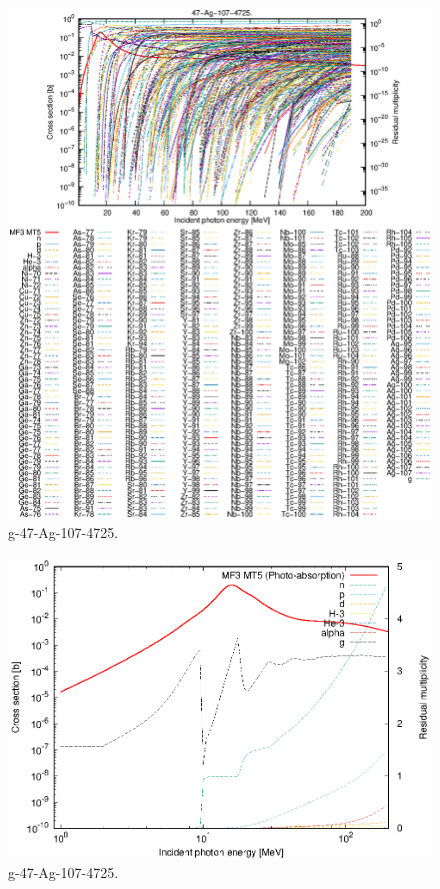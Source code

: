 \begin{figure}
 \includegraphics[width=\linewidth]{eps/g_47-Ag-107_4725.eps}
  \caption{g-47-Ag-107-4725.}
\end{figure}
\newpage \clearpage

\begin{figure}
 \includegraphics[width=\linewidth]{eps-log/g_47-Ag-107_4725.eps}
 \caption{g-47-Ag-107-4725.}
\end{figure}
\newpage \clearpage


